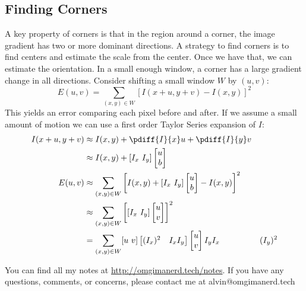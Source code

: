 \documentclass{math}
\begin{document}
\subsection*{Finding Corners}
A key property of corners is that in the region around a corner, the image
gradient has two or more dominant directions. A strategy to find corners is to
find centers and estimate the scale from the center. Once we have that, we can
estimate the orientation. In a small enough window, a corner has a large
gradient change in all directions. Consider shifting a small window \( W \) by
\( (u,v) \):
\[ E(u,v) = \sum_{(x,y)\in W}[I(x+u,y+v)-I(x,y)]^2 \]
This yields an error comparing each pixel before and after. If we assume a
small amount of motion we can use a first order Taylor Series expansion of
\( I \):
\begin{align*}
  I(x+u,y+v) &\approx I(x,y)+\pdiff{I}{x}u+\pdiff{I}{y}v \\
  &\approx I(x,y)+[I_x\ I_y]\begin{bmatrix}u \\ b\end{bmatrix} \\
  E(u,v) &\approx \sum_{(x,y)\in W}\left[I(x,y)+[I_x\ I_y]
    \begin{bmatrix}u \\ b\end{bmatrix}-I(x,y)\right]^2 \\
  &\approx \sum_{(x,y)\in W}\left[[I_x\ I_y]\begin{bmatrix}u \\ v\end{bmatrix}\right]^2 \\
  &= \sum_{(x,y)\in W}[u\ v]\begin{bmatrix}
    (I_x)^2 & I_xI_y \\
  \end{bmatrix}\begin{bmatrix}u \\ v\end{bmatrix}
    I_yI_x & (I_y)^2
\end{align*}

\begin{center}
  You can find all my notes at \url{http://omgimanerd.tech/notes}. If you have
  any questions, comments, or concerns, please contact me at
  alvin@omgimanerd.tech
\end{center}
\end{document}

